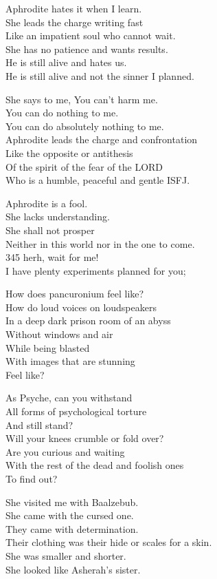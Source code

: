 \documentclass[
]{book}
\begin{document}
Aphrodite hates it when I learn.\\
She leads the charge writing fast\\
Like an impatient soul who cannot wait.\\
She has no patience and wants results.\\
He is still alive and hates us.\\
He is still alive and not the sinner I planned.

She says to me, You can't harm me.\\
You can do nothing to me.\\
You can do absolutely nothing to me.\\
Aphrodite leads the charge and confrontation\\
Like the opposite or antithesis\\
Of the spirit of the fear of the LORD\\
Who is a humble, peaceful and gentle ISFJ.

Aphrodite is a fool.\\
She lacks understanding.\\
She shall not prosper\\
Neither in this world nor in the one to come.\\
345 herh, wait for me!\\
I have plenty experiments planned for you;

How does pancuronium feel like?\\
How do loud voices on loudspeakers\\
In a deep dark prison room of an abyss\\
Without windows and air\\
While being blasted\\
With images that are stunning\\
Feel like?

As Psyche, can you withstand\\
All forms of psychological torture\\
And still stand?\\
Will your knees crumble or fold over?\\
Are you curious and waiting\\
With the rest of the dead and foolish ones\\
To find out?

She visited me with Baalzebub.\\
She came with the cursed one.\\
They came with determination.\\
Their clothing was their hide or scales for a skin.\\
She was smaller and shorter.\\
She looked like Asherah's sister.
\end{document}
